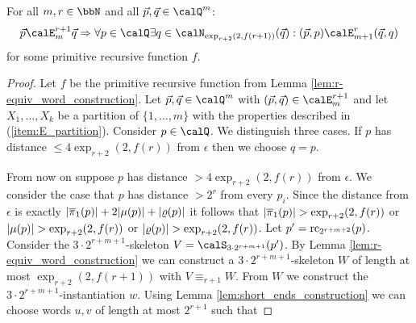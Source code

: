 \begin{lemma}\label{lem:EF_relations}
	For all $m,r\in\bbN$ and all $\vec{p},\vec{q}\in \Qx^m$:  
	\[\vec{p} \calE^{r+1}_m \vec{q} \Rightarrow \forall p\in \Qx \exists q\in \calN_{\exp_{r+2}(2,f(r+1))}(\vec{q}): (\vec{p}, p) \calE^{r}_{m+1} (\vec{q}, q)\]
	for some primitive recursive function $f$.
\end{lemma}
\begin{proof}
	Let $f$ be the primitive recursive function from Lemma \ref{lem:r-equiv_word_construction}.
	Let $\vec{p}, \vec{q} \in \Qx^m$ with $(\vec{p}, \vec{q}) \in \calE^{r+1}_m$ and 
	let $X_1,\ldots,X_k$ be a partition of $\{1,\ldots,m\}$ with the properties described in (\ref{item:E_partition}). 
	Consider $p\in \Qx$. We distinguish three cases.
	If $p$ has distance $\leq 4\exp_{r+2}(2, f(r))$ from $\epsilon$ then we choose $q=p$.
	
	From now on suppose $p$ has distance $> 4\exp_{r+2}(2, f(r))$ from $\epsilon$.
	We consider the case that $p$ has distance $>2^r$ from every $p_i$.
	Since the distance from $\epsilon$ is exactly $|\overline{\pi}_1(p)| + 2|\mu(p)| + |\varrho(p)|$ it follows that $|\overline{\pi}_1(p)| > \exp_{r+2}(2,f(r))$ or $|\mu(p)| > \exp_{r+2}(2,f(r))$ or $|\varrho(p)| > \exp_{r+2}(2,f(r))$. 
	Let $p'= \operatorname{rc}_{2^{r+m+2}}(p)$.  Consider 
	the $3\cdot 2^{r+m+1}$-skeleton $V = \calS_{3\cdot 2^{r+m+1}}(p')$. By Lemma \ref{lem:r-equiv_word_construction} we can construct a $3\cdot 2^{r+m+1}$-skeleton $W$ of length at most $\exp_{r+2}(2,f(r+1))$ with $V \equiv_{r+1} W$. From $W$ we construct the $3\cdot 2^{r+m+1}$-instantiation $w$. Using Lemma \ref{lem:short_ends_construction} we can choose words $u,v$ of length at most 
	$2^{r+1}$ such that 
	

\end{proof}

